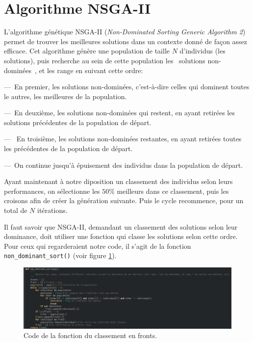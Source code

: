 \documentclass[11pt, a4paper, oneside, portrait]{report}
\begin{document}
    \section*{Algorithme NSGA-II}
        L'algorithme génétique NSGA-II (\emph{Non-Dominated Sorting Generic Algorithm 2}) permet de trouver les meilleures solutions dans un contexte donné de façon assez efficace.
        Cet algorithme génère une population de taille $N$ d'individus (les solutions), puis recherche au sein de cette population les \guillemotleft{}~solutions non-dominées~\guillemotright{}, et les range en suivant cette ordre:

        ---~En premier, les solutions non-dominées, c'est-à-dire celles qui dominent toutes le autres, les meilleures de la population.

        ---~En deuxième, les solutions non-dominées qui restent, en ayant retirées les solutions précédentes de la population de départ.

        ---~ En troisième, les solutions non-dominées restantes, en ayant retirées toutes les précédentes de la population de départ.

        ---~On continue jusqu'à épuisement des individus dans la population de départ.

        Ayant maintenant à notre diposition un classement des individus selon leurs performances, on sélectionne les $50\%{}$ meilleurs dans ce classement, puis les croisons afin de créer la génération suivante.
        Puis le cycle recommence, pour un total de $N$ itérations.

        Il faut savoir que NSGA-II, demandant un classement des solutions selon leur dominance, doit utiliser une fonction qui classe les solutions selon cette ordre. Pour ceux qui regarderaient notre code, il s'agit de la fonction \texttt{non\_dominant\_sort()} (voir figure \ref{fig:non_dominant_sort}).

        \begin{figure}[H]
            \centering
            \includegraphics[width=\textwidth]{Figures/non_dominant_sort.png}
            \caption{Code de la fonction du classement en fronts.}
            \label{fig:non_dominant_sort}
        \end{figure}
\end{document}
